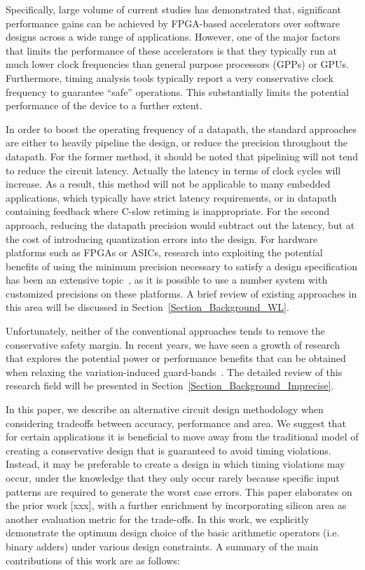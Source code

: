 \documentclass[journal]{IEEEtran}
\begin{document}
Specifically, large volume of current studies has demonstrated that, significant performance gains can be achieved by FPGA-based accelerators over software designs across a wide range of applications. However, one of the major factors that limits the performance of these accelerators is that they typically run at much lower clock frequencies than general purpose processors (GPPs) or GPUs. Furthermore, timing analysis tools typically report a very conservative clock frequency to guarantee ``safe'' operations. This substantially limits the potential performance of the device to a further extent.

In order to boost the operating frequency of a datapath, the standard approaches are either to heavily pipeline the design, or reduce the precision throughout the datapath. For the former method, it should be noted that pipelining will not tend to reduce the circuit latency. Actually the latency in terms of clock cycles will increase. As a result, this method will not be applicable to many embedded applications, which typically have strict latency requirements, or in datapath containing feedback where C-slow retiming is inappropriate. For the second approach, reducing the datapath precision would subtract out the latency, but at the cost of introducing quantization errors into the design. For hardware platforms such as FPGAs or ASICs, research into exploiting the potential benefits of using the minimum precision necessary to satisfy a design specification has been an extensive topic~\cite{GeorgeDT11}, as it is possible to use a number system with customized precisions on these platforms. A brief review of existing approaches in this area will be discussed in Section~\ref{Section_Background_WL}.

Unfortunately, neither of the conventional approaches tends to remove the conservative safety margin. In recent years, we have seen a growth of research that explores the potential power or performance benefits that can be obtained when relaxing the variation-induced guard-bands~\cite{NewBox2004}. The detailed review of this research field will be presented in Section~\ref{Section_Background_Imprecise}.

In this paper, we describe an alternative circuit design methodology when considering tradeoffs between accuracy, performance and area. We suggest that for certain applications it is beneficial to move away from the traditional model of creating a conservative design that is guaranteed to avoid timing violations. Instead, it may be preferable to create a design in which timing violations may occur, under the knowledge that they only occur rarely because specific input patterns are required to generate the worst case errors. This paper elaborates on the prior work [xxx], with a further enrichment by incorporating silicon area as another evaluation metric for the trade-offs. In this work, we explicitly demonstrate the optimum design choice of the basic arithmetic operators (i.e. binary adders) under various design constraints. A summary of the main contributions of this work are as follows:
\end{document}
